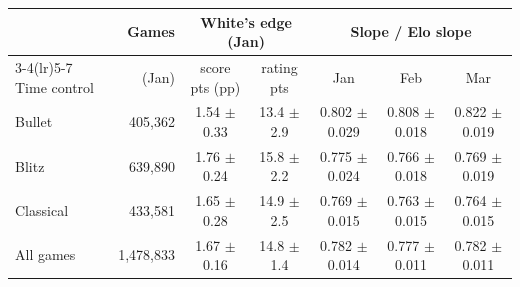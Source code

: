 \begin{tabular}{lrccccc}
\toprule
 & Games & \multicolumn{2}{c}{White's edge (Jan)} & \multicolumn{3}{c}{Slope / Elo slope} \\
\cmidrule(lr){3-4}\cmidrule(lr){5-7}
Time control & (Jan) & score pts (pp) & rating pts & Jan & Feb & Mar \\
\midrule
Bullet & 405,362 & 1.54 $\pm$ 0.33 & 13.4 $\pm$ 2.9 & 0.802 $\pm$ 0.029 & 0.808 $\pm$ 0.018 & 0.822 $\pm$ 0.019 \\
Blitz & 639,890 & 1.76 $\pm$ 0.24 & 15.8 $\pm$ 2.2 & 0.775 $\pm$ 0.024 & 0.766 $\pm$ 0.018 & 0.769 $\pm$ 0.019 \\
Classical & 433,581 & 1.65 $\pm$ 0.28 & 14.9 $\pm$ 2.5 & 0.769 $\pm$ 0.015 & 0.763 $\pm$ 0.015 & 0.764 $\pm$ 0.015 \\
All games & 1,478,833 & 1.67 $\pm$ 0.16 & 14.8 $\pm$ 1.4 & 0.782 $\pm$ 0.014 & 0.777 $\pm$ 0.011 & 0.782 $\pm$ 0.011 \\
\bottomrule
\end{tabular}
